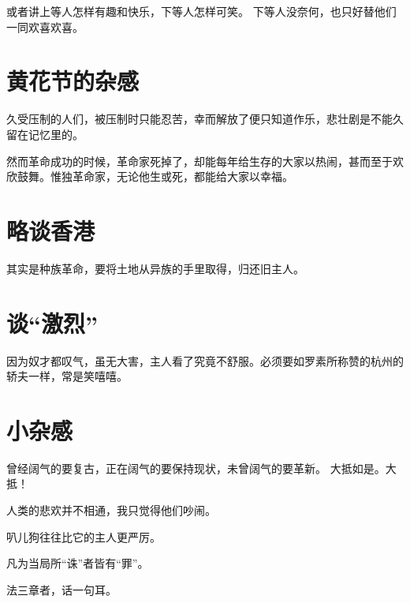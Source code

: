 \documentclass[a4paper]{article}
\begin{document}
或者讲上等人怎样有趣和快乐，下等人怎样可笑。
下等人没奈何，也只好替他们一同欢喜欢喜。

\section{黄花节的杂感}

久受压制的人们，被压制时只能忍苦，幸而解放了便只知道作乐，悲壮剧是不能久留在记忆里的。

然而革命成功的时候，革命家死掉了，却能每年给生存的大家以热闹，甚而至于欢欣鼓舞。惟独革命家，无论他生或死，都能给大家以幸福。

\section{略谈香港}

其实是种族革命，要将土地从异族的手里取得，归还旧主人。

\section{谈“激烈”}

因为奴才都叹气，虽无大害，主人看了究竟不舒服。必须要如罗素所称赞的杭州的轿夫一样，常是笑嘻嘻。

\section{小杂感}

曾经阔气的要复古，正在阔气的要保持现状，未曾阔气的要革新。
大抵如是。大抵！

人类的悲欢并不相通，我只觉得他们吵闹。

叭儿狗往往比它的主人更严厉。

凡为当局所“诛”者皆有“罪”。

法三章者，话一句耳。
\end{document}
